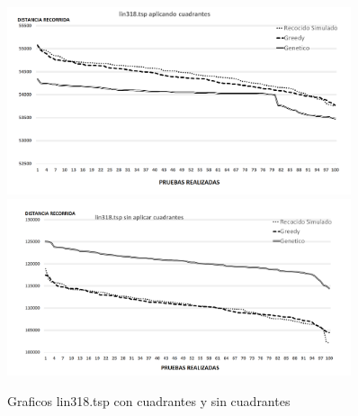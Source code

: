  \begin{figure}[hbtp]
    \centering
        \includegraphics[width=0.9\textwidth]{PruebasResultados/Experimentos_Graficos_Con/lin318.png}
        \includegraphics[width=0.9\textwidth]{PruebasResultados/Experimentos_Graficos_Sin/lin318.png}
        \caption{Graficos lin318.tsp con cuadrantes y sin cuadrantes}
        \label{fig:lin318_grafica.png}
\end{figure}
\newpage

